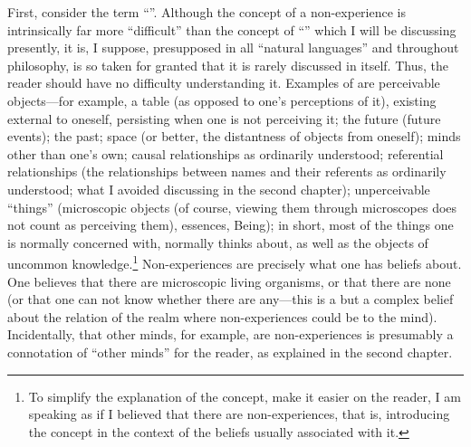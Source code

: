 First, consider the term \enquote{}. Although the concept of a 
non-experience is intrinsically far more \enquote{difficult} than the concept of 
\enquote{} which I will be discussing presently, it is, I suppose, 
presupposed in all \enquote{natural languages} and throughout philosophy, is so 
taken for granted that it is rarely discussed in itself. Thus, the reader should 
have no difficulty understanding it. Examples of  are 
perceivable objects---for example, a table (as opposed to one's perceptions of 
it), existing external to oneself, persisting when one is not perceiving it; the 
future (future events); the past; space (or better, the distantness of objects 
from oneself); minds other than one's own; causal relationships as ordinarily 
understood; referential relationships (the relationships between names and 
their referents as ordinarily understood; what I avoided discussing in the 
second chapter); unperceivable \enquote{things} (microscopic objects (of course, 
viewing them through microscopes does not count as perceiving them), 
essences, Being); in short, most of the things one is normally concerned with, 
normally thinks about, as well as the objects of uncommon knowledge.\footnote{To 
simplify the explanation of the concept, make it easier on the reader, I am 
speaking as if I believed that there are non-experiences, that is, introducing 
the concept in the context of the beliefs usually associated with it.}
Non-experiences are precisely what one has beliefs about. One believes that 
there are microscopic living organisms, or that there are none (or that one 
can not know whether there are any---this is  a  but a complex 
belief about the relation of the realm where non-experiences could be to the 
mind). Incidentally, that other minds, for example, are non-experiences is 
presumably a connotation of \enquote{other minds} for the reader, as explained in the 
second chapter. 

